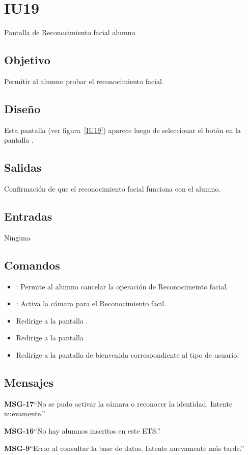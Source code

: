 \section{IU19} {Pantalla de Reconocimiento facial alumno}

\subsection{Objetivo}
Permitir al alumno probar el reconocimiento facial.

\subsection{Diseño}
Esta pantalla  (ver figura~\ref{IU19}) aparece luego de seleccionar el botón  en la pantalla .


\subsection{Salidas}
Confirmación de que el reconocimiento facial funciona con el alumno.

\subsection{Entradas}
Ninguna

\subsection{Comandos}
\begin{itemize}
    \item {}: Permite al alumno cancelar la operación de Reconocimeinto facial.
    \item {}: Activa la cámara para el Reconocimiento facil. 
    \item {} Redirige a la pantalla .
    \item {} Redirige a la pantalla .
    \item {} Redirige a la pantalla de bienvenida correspondiente al tipo de usuario.
\end{itemize}

\subsection{Mensajes}

\begin{Citemize}
    \item {\bf MSG-17}{``No se pudo activar la cámara o reconocer la identidad. Intente nuevamente.''}
    \item {\bf MSG-16}{``No hay alumnos inscritos en este ETS.''}
    \item {\bf MSG-9}{``Error al consultar la base de datos. Intente nuevamente más tarde.''}
\end{Citemize}